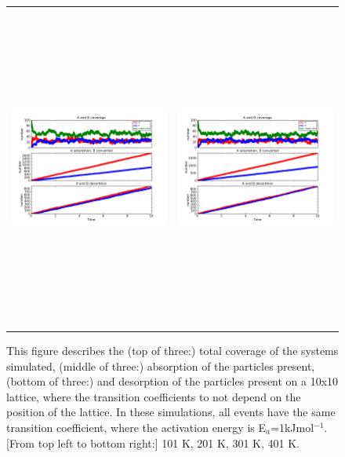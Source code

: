 \documentclass[11pt]{article}
\begin{document}
\begin{figure}[h!]
\begin{tabular}{cc}
\includegraphics[width=3.5in, height=4.2in]{./coadsorb_irreversible/AtoBirreversible10x10_301_allsameksmall_A5_EA1E3_3.png} &
\includegraphics[width=3.5in, height=4.2in]{./coadsorb_irreversible/AtoBirreversible10x10_401_allsameksmall_A5_EA1E3_3.png} 
\end{tabular}
\caption{This figure describes the (top of three:) total coverage of the systems simulated, (middle of three:) absorption of the particles present, (bottom of three:) and desorption of the particles present on a 10x10 lattice, where the transition coefficients to not depend on the position of the lattice. In these simulations, all events have the same transition coefficient, where the activation energy is E$_a$=1kJmol$^{-1}$. [From top left to bottom right:] 101 K, 201 K, 301 K, 401 K. }
\end{figure}
\end{document}
